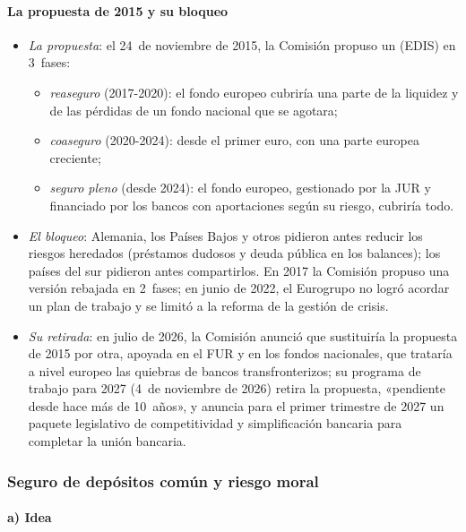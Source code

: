 \documentclass[11pt]{article}
\begin{document}
\paragraph{La propuesta de 2015 y su bloqueo}

\begin{itemize}
\item \emph{La propuesta}: el 24~de noviembre de 2015, la Comisión propuso un  (EDIS) en 3~fases\nocite{CE2015EDIS}:
  \begin{itemize}
  \item \emph{reaseguro} (2017-2020): el fondo europeo cubriría una parte de la liquidez y de las pérdidas de un fondo nacional que se agotara;
  \item \emph{coaseguro} (2020-2024): desde el primer euro, con una parte europea creciente;
  \item \emph{seguro pleno} (desde 2024): el fondo europeo, gestionado por la JUR y financiado por los bancos con aportaciones según su riesgo, cubriría todo.
  \end{itemize}
\item \emph{El bloqueo}: Alemania, los Países Bajos y otros pidieron antes reducir los riesgos heredados (préstamos dudosos y deuda pública en los balances); los países del sur pidieron antes compartirlos. En 2017 la Comisión propuso una versión rebajada en 2~fases; en junio de 2022, el Eurogrupo no logró acordar un plan de trabajo y se limitó a la reforma de la gestión de crisis\nocite{Eurogrupo2022UB,PE2026EDIS}.
\item \emph{Su retirada}: en julio de 2026, la Comisión anunció que sustituiría la propuesta de 2015 por otra, apoyada en el FUR y en los fondos nacionales, que trataría a nivel europeo las quiebras de bancos transfronterizos; su programa de trabajo para 2027 (4~de noviembre de 2026) retira la propuesta, «pendiente desde hace más de 10~años», y anuncia para el primer trimestre de 2027 un paquete legislativo de competitividad y simplificación bancaria para completar la unión bancaria\nocite{CE2026Competitividad,CE2026Programa2027}.
\end{itemize}

\subsubsection{Seguro de depósitos común y riesgo moral}\label{sec:seguro-comun}

\paragraph{a) Idea}
\end{document}
